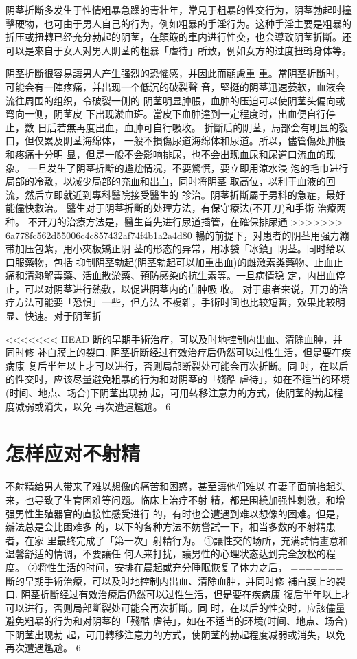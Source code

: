 \documentclass[12pt,UTF8]{ctexbook}
\begin{document}
阴茎折斷多发生于性情粗暴急躁的青壮年，常見于粗暴的性交行为，阴茎勃起时撞擊硬物，也可由于男人自己的行为，例如粗暴的手淫行为。这种手淫主要是粗暴的折压或扭轉已经充分勃起的阴茎，在顛簸的車内进行性交，也会導致阴茎折斷。还可以是來自于女人对男人阴茎的粗暴「虐待」所致，例如女方的过度扭轉身体等。

阴茎折斷很容易讓男人产生强烈的恐懼感，并因此而顧慮重
重。當阴茎折斷时，可能会有一陣疼痛，并出现一个低沉的破裂聲
音，堅挺的阴茎迅速萎软，血液会流往周围的组织，令破裂一侧的
阴茎明显肿脹，血肿的压迫可以使阴茎头偏向或弯向一侧，阴茎皮
下出现淤血斑。當皮下血肿達到一定程度时，出血便自行停止，数
日后若無再度出血，血肿可自行吸收。
折斷后的阴茎，局部会有明显的裂口，但仅累及阴茎海绵体，
一般不損傷尿道海绵体和尿道。所以，儘管傷处肿脹和疼痛十分明
显，但是一般不会影响排尿，也不会出现血尿和尿道口流血的现
象。
一旦发生了阴茎折斷的尷尬情况，不要驚慌，要立即用涼水浸
泡的毛巾进行局部的冷敷，以减少局部的充血和出血，同时将阴茎
取高位，以利于血液的回流，然后立即就近到專科醫院接受醫生的
診治。阴茎折斷屬于男科的急症，最好能儘快救治。
醫生对于阴茎折斷的处理方法，有保守療法(不开刀)和手術
治療两种。
不开刀的治療方法是，醫生首先进行尿道插管，在確保排尿通
>>>>>>> 6a778fc562d55006c4c857432af74f4b1a2a4d80
暢的前提下，对患者的阴茎用强力繃带加压包紮，用小夾板矯正阴
茎的形态的异常，用冰袋「冰鎮」阴茎。同时给以口服藥物，包括
抑制阴茎勃起(阴茎勃起可以加重出血)的雌激素类藥物、止血止
痛和清熱解毒藥、活血散淤藥、預防感染的抗生素等。一旦病情稳
定，内出血停止，可以对阴茎进行熱敷，以促进阴茎内的血肿吸
收。
对于患者来说，开刀的治疗方法可能要「恐惧」一些，但方法
不複雜，手術时间也比较短暫，效果比较明显、快速。对于阴茎折

<<<<<<< HEAD
断的早期手術治疗，可以及时地控制内出血、清除血肿，并同时修
补白膜上的裂口.
阴茎折断经过有效治疗后仍然可以过性生活，但是要在疾病康
复后半年以上才可以进行，否则局部断裂处可能会再次折断。同
时，在以后的性交时，应该尽量避免粗暴的行为和对阴茎的「殘酷
虐待」，如在不适当的环境(时间、地点、场合)下阴茎出现勃
起，可用转移注意力的方式，使阴茎的勃起程度减弱或消失，以免
再次遭遇尷尬。
6
\section{怎样应对不射精}
不射精给男人带来了难以想像的痛苦和困惑，甚至讓他们难以
在妻子面前抬起头来，也导致了生育困难等问题。临床上治疗不射
精，都是围繞加强性刺激，和增强男性生殖器官的直接性感受进行
的，有时也会遭遇到难以想像的困难。但是，辦法总是会比困难多
的，以下的各种方法不妨嘗試一下，相当多数的不射精患者，在家
里最终完成了「第一次」射精行为。
①讓性交的场所，充满詩情畫意和温馨舒适的情调，不要讓任
何人来打扰，讓男性的心理状态达到完全放松的程度。
②将性生活的时间，安排在晨起或充分睡眠恢复了体力之后，
=======
斷的早期手術治療，可以及时地控制内出血、清除血肿，并同时修
補白膜上的裂口.
阴茎折斷经过有效治療后仍然可以过性生活，但是要在疾病康
復后半年以上才可以进行，否则局部斷裂处可能会再次折斷。同
时，在以后的性交时，应該儘量避免粗暴的行为和对阴茎的「殘酷
虐待」，如在不适当的环境(时间、地点、场合)下阴茎出现勃
起，可用轉移注意力的方式，使阴茎的勃起程度减弱或消失，以免
再次遭遇尷尬。
6
\end{document}
